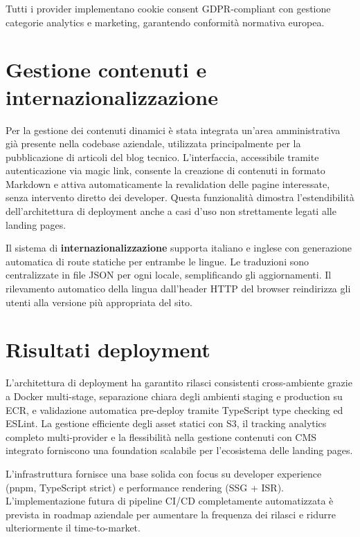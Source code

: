 Tutti i provider implementano cookie consent GDPR-compliant con gestione 
categorie analytics e marketing, garantendo conformità normativa europea.

\section{Gestione contenuti e internazionalizzazione}

Per la gestione dei contenuti dinamici è stata integrata un'area amministrativa 
già presente nella codebase aziendale, utilizzata principalmente per la 
pubblicazione di articoli del blog tecnico. L'interfaccia, accessibile tramite 
autenticazione via magic link, consente la creazione di contenuti in formato 
Markdown e attiva automaticamente la revalidation delle pagine interessate, 
senza intervento diretto dei developer. Questa funzionalità dimostra 
l'estendibilità dell'architettura di deployment anche a casi d'uso non 
strettamente legati alle landing pages.

Il sistema di \textbf{internazionalizzazione} supporta italiano e inglese con 
generazione automatica di route statiche per entrambe le lingue. Le traduzioni 
sono centralizzate in file JSON per ogni locale, semplificando gli aggiornamenti. 
Il rilevamento automatico della lingua dall'header HTTP del browser reindirizza 
gli utenti alla versione più appropriata del sito.

\section{Risultati deployment}

L'architettura di deployment ha garantito rilasci consistenti cross-ambiente grazie 
a Docker multi-stage, separazione chiara degli ambienti staging e production su ECR, 
e validazione automatica pre-deploy tramite TypeScript type checking ed ESLint. 
La gestione efficiente degli asset statici con S3, il tracking analytics completo 
multi-provider e la flessibilità nella gestione contenuti con CMS integrato 
forniscono una foundation scalabile per l'ecosistema delle landing pages.

\bigskip
L'infrastruttura fornisce una base solida con focus su developer experience 
(pnpm, TypeScript strict) e performance rendering (SSG + ISR). 
L'implementazione futura di pipeline CI/CD completamente automatizzata è prevista 
in roadmap aziendale per aumentare la frequenza dei rilasci e ridurre ulteriormente 
il time-to-market.